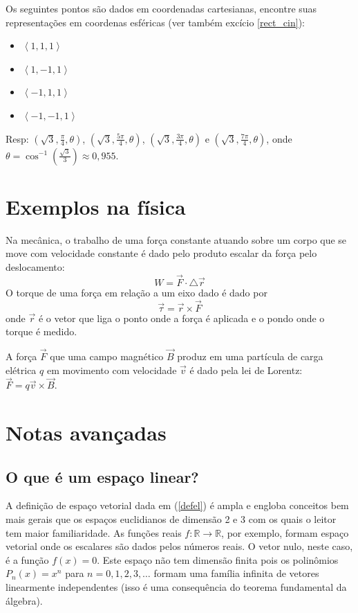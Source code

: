 \begin{exer}\label{rect_esf} Os seguintes pontos são dados em coordenadas cartesianas, encontre suas representações em coordenas esféricas (ver também excício \ref{rect_cin}):
\begin{itemize}
\item [a)] $\left<1,1,1\right>$
\item [b)] $\left<1,-1,1\right>$
\item [c)] $\left<-1,1,1\right>$
\item [d)] $\left<-1,-1,1\right>$
\end{itemize}
\end{exer}
Resp: $\left(\sqrt{3},\frac{\pi}{4},\theta\right)$,  $\left(\sqrt{3},\frac{5\pi}{4},\theta\right)$, $\left(\sqrt{3},\frac{3\pi}{4},\theta\right)$ e  $\left(\sqrt{3},\frac{7\pi}{4},\theta\right)$, onde $\theta=\cos^{-1}\left(\frac{\sqrt{3}}{3}\right)\approx 0,955.$



\section{Exemplos na física}
Na mecânica, o trabalho de uma força constante atuando sobre um corpo que se move com velocidade constante é dado pelo produto escalar da força pelo deslocamento:
$$W=\vec{F}\cdot \triangle\vec{ r}$$
O torque de uma força em relação a um eixo dado é dado por
$$\vec{\tau}=\vec{r}\times \vec{F}$$
onde $\vec{r}$ é o vetor que liga o ponto onde a força é aplicada e o pondo onde o torque é medido.

A força $\vec{F}$ que uma campo magnético $\vec{B}$ produz em uma partícula de carga elétrica $q$ em movimento com velocidade $\vec{v}$ é dado pela lei de Lorentz:
$\vec{F}=q\vec{v}\times\vec{B}.$

\section{Notas avançadas}
\subsection{O que é um espaço linear?}
A definição de espaço vetorial dada em (\ref{defel}) é ampla e engloba conceitos bem mais gerais que os espaços euclidianos de dimensão 2 e 3 com os quais o leitor tem maior familiaridade. As funções reais $f:\mathbb{R}\to\mathbb{R}$, por exemplo, formam espaço vetorial onde os escalares são dados pelos números reais. O vetor nulo, neste caso, é a função $f(x)=0$. Este espaço não tem dimensão finita pois os polinômios $P_{n}(x)=x^n$ para $n=0,1,2,3,\ldots$ formam uma família infinita de vetores linearmente independentes (isso é uma consequência do teorema fundamental da álgebra).

